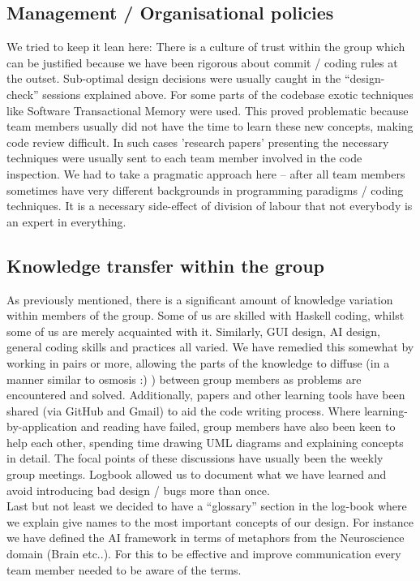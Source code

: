 \documentclass[11pt]{article} \usepackage{fullpage} \usepackage{cite}
\begin{document}
\subsection{Management / Organisational policies}
We tried to keep it lean here: There is a culture of trust within the group
which can be justified because we have been rigorous about commit / coding rules
at the outset. Sub-optimal design decisions were usually caught in the
``design-check'' sessions explained above. For some parts of the codebase exotic
techniques like Software Transactional Memory were used. This proved problematic
because team members usually did not have the time to learn these new concepts,
making code review difficult. In such cases 'research papers' presenting the
necessary techniques were usually sent to each team member involved in the code
inspection. We had to take a pragmatic approach here -- after all team members
sometimes have very different backgrounds in programming paradigms / coding
techniques. It is a necessary side-effect of division of labour that not
everybody is an expert in everything.

\subsection{Knowledge transfer within the group}
As previously mentioned, there is a significant amount of knowledge variation
within members of the group. Some of us are skilled with Haskell coding, whilst
some of us are merely acquainted with it. Similarly, GUI design, AI design,
general coding skills and practices all varied. We have remedied this somewhat
by working in pairs or more, allowing the parts of the knowledge to diffuse (in
a manner similar to osmosis :) ) between group members as problems are
encountered and solved. Additionally, papers and other learning tools have been
shared (via GitHub and Gmail) to aid the code writing process. Where
learning-by-application and reading have failed, group members have also been
keen to help each other, spending time drawing UML diagrams and explaining
concepts in detail. The focal points of these discussions have usually been the
weekly group meetings. Logbook allowed us to document what we have learned and
avoid introducing bad design / bugs more than once.  \\ Last but not least we
decided to have a ``glossary'' section in the log-book where we explain give
names to the most important concepts of our design. For instance we have defined
the AI framework in terms of metaphors from the Neuroscience domain (Brain
etc..). For this to be effective and improve communication every team member
needed to be aware of the terms.
\end{document}
